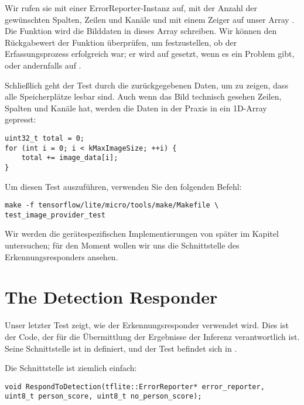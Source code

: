 Wir rufen sie mit einer ErrorReporter-Instanz auf, mit der Anzahl der gewünschten Spalten, Zeilen und Kanäle und mit einem Zeiger auf unser Array . Die Funktion wird die Bilddaten in dieses Array schreiben. Wir können den Rückgabewert der Funktion überprüfen, um festzustellen, ob der Erfassungsprozess erfolgreich war; er wird auf  gesetzt, wenn es ein Problem gibt, oder andernfalls auf .

Schließlich geht der Test durch die zurückgegebenen Daten, um zu zeigen, dass alle Speicherplätze lesbar sind. Auch wenn das Bild technisch gesehen Zeilen, Spalten und Kanäle hat, werden die Daten in der Praxis in ein 1D-Array gepresst:

\begin{code}
    \begin{lstlisting}
uint32_t total = 0;
for (int i = 0; i < kMaxImageSize; ++i) {
    total += image_data[i];
}
  \end{lstlisting}
\end{code}

Um diesen Test auszuführen, verwenden Sie den folgenden Befehl:

\begin{code}
    \begin{lstlisting}
make -f tensorflow/lite/micro/tools/make/Makefile \
test_image_provider_test
  \end{lstlisting}
\end{code}

Wir werden die gerätespezifischen Implementierungen von  später im Kapitel untersuchen; für den Moment wollen wir uns die Schnittstelle des Erkennungsresponders ansehen.

\section{The Detection Responder}

Unser letzter Test zeigt, wie der Erkennungsresponder verwendet wird. Dies ist der Code, der für die Übermittlung der Ergebnisse der Inferenz verantwortlich ist. Seine Schnittstelle ist in  definiert, und der Test befindet sich in .

Die Schnittstelle ist ziemlich einfach:

\begin{code}
    \begin{lstlisting}
void RespondToDetection(tflite::ErrorReporter* error_reporter,
uint8_t person_score, uint8_t no_person_score);
  \end{lstlisting}
\end{code}


